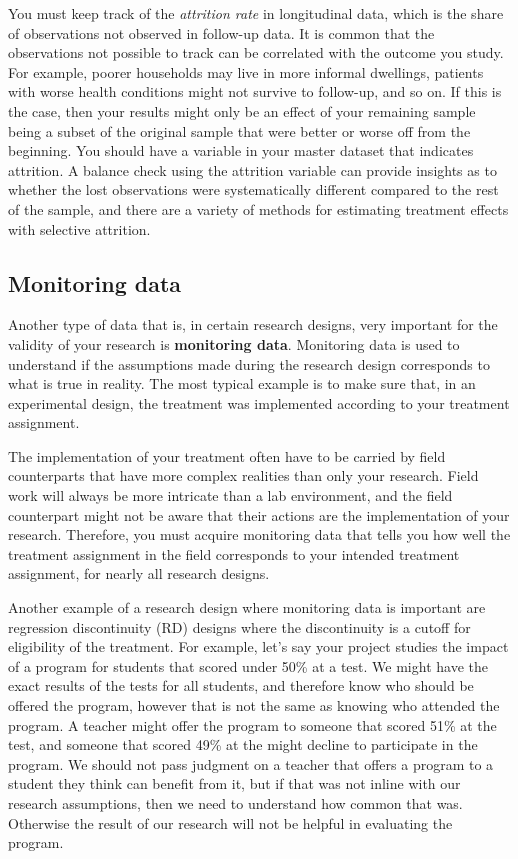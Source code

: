 You must keep track of the \textit{attrition rate} in longitudinal data,
which is the share of observations not observed in follow-up data.
It is common that the observations not possible to track
can be correlated with the outcome you study.
For example, poorer households may live in more informal dwellings,
patients with worse health conditions might not survive to follow-up,
and so on.
If this is the case, then your results might only be an effect of your remaining sample
being a subset of the original sample that were better or worse off from the beginning.
You should have a variable in your master dataset that indicates attrition.
A balance check using the attrition variable can provide insights
as to whether the lost observations were systematically different
compared to the rest of the sample,
and there are a variety of methods for estimating treatment effects
with selective attrition.

\subsection{Monitoring data}

Another type of data that is, in certain research designs,
very important for the validity of your research is \textbf{monitoring data}.
Monitoring data is used to understand if the
assumptions made during the research design corresponds to what is true in reality.
The most typical example is to make sure that, in an experimental design,
the treatment was implemented according to your treatment assignment.

The implementation of your treatment often have to be carried by field counterparts
that have more complex realities than only your research.
Field work will always be more intricate than a lab environment, 
and the field counterpart might not be aware that their actions are the implementation of your research.
Therefore, you must acquire monitoring data that tells you how well the treatment assignment in the field
corresponds to your intended treatment assignment,
for nearly all research designs.

Another example of a research design where monitoring data is important
are regression discontinuity (RD) designs
where the discontinuity is a cutoff for eligibility of the treatment. 
For example, 
let's say your project studies the impact of a program for students that scored under 50\% at a test.
We might have the exact results of the tests for all students, 
and therefore know who should be offered the program, 
however that is not the same as knowing who attended the program. 
A teacher might offer the program to someone that scored 51\% at the test,
and someone that scored 49\% at the might decline to participate in the program.
We should not pass judgment on a teacher that offers a program to a student
they think can benefit from it, 
but if that was not inline with our research assumptions,
then we need to understand how common that was.
Otherwise the result of our research will not be helpful
in evaluating the program.

